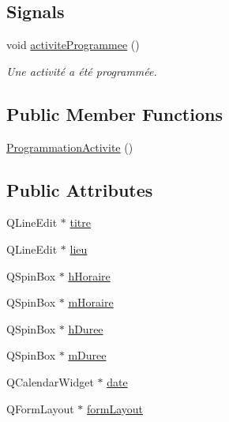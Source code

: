\subsection*{Signals}
\begin{DoxyCompactItemize}
\item 
void \hyperlink{class_programmation_activite_a7101e83ceba3f4eb7302bafa4862011f}{activite\+Programmee} ()
\begin{DoxyCompactList}\small\item\em Une activité a été programmée. \end{DoxyCompactList}\end{DoxyCompactItemize}
\subsection*{Public Member Functions}
\begin{DoxyCompactItemize}
\item 
\hyperlink{class_programmation_activite_ae36ea268d121dddc0633ed9bfc7fc3b6}{Programmation\+Activite} ()
\end{DoxyCompactItemize}
\subsection*{Public Attributes}
\begin{DoxyCompactItemize}
\item 
Q\+Line\+Edit $\ast$ \hyperlink{class_programmation_activite_a4abe5a47855bf2955f81f75c48d1e705}{titre}
\item 
Q\+Line\+Edit $\ast$ \hyperlink{class_programmation_activite_ad11789d8e5720d094c2b18f0ab79c8fd}{lieu}
\item 
Q\+Spin\+Box $\ast$ \hyperlink{class_programmation_activite_a7edeef86cb3b134a39b3289c11930cfe}{h\+Horaire}
\item 
Q\+Spin\+Box $\ast$ \hyperlink{class_programmation_activite_a4f962ff214fd6decf90e97cde1c1b7d5}{m\+Horaire}
\item 
Q\+Spin\+Box $\ast$ \hyperlink{class_programmation_activite_af5e275e33582e76962bc991b042951a7}{h\+Duree}
\item 
Q\+Spin\+Box $\ast$ \hyperlink{class_programmation_activite_af7138f1541605f97e14984c977ad5632}{m\+Duree}
\item 
Q\+Calendar\+Widget $\ast$ \hyperlink{class_programmation_activite_a4530b3c068395d0a0d87d2f7d00d6ff0}{date}
\item 
Q\+Form\+Layout $\ast$ \hyperlink{class_programmation_activite_a1cf55e2cad5a97ba1ba0238bfe804eb9}{form\+Layout}
\end{DoxyCompactItemize}



